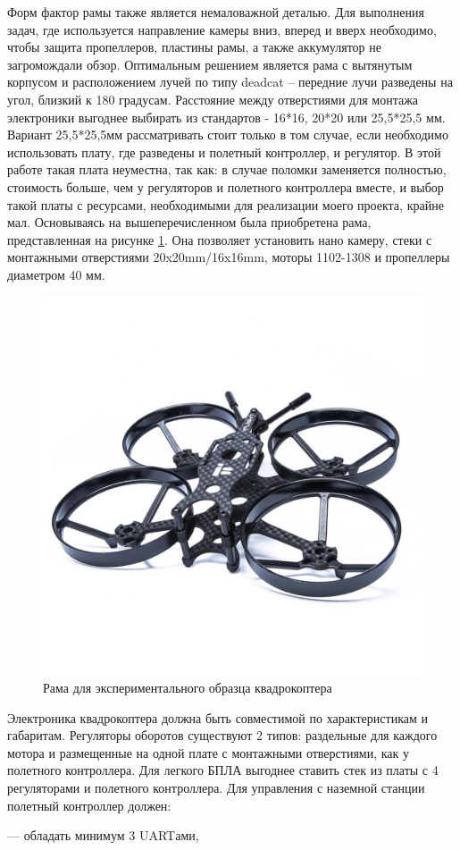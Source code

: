Форм фактор рамы также является немаловажной деталью. Для выполнения задач, где используется направление камеры вниз, вперед и вверх необходимо, чтобы защита пропеллеров, пластины рамы, а также аккумулятор не загромождали обзор. Оптимальным решением является рама с вытянутым корпусом и расположением лучей по типу deadcat -- передние лучи разведены на угол, близкий к 180 градусам. Расстояние между отверстиями для монтажа электроники выгоднее выбирать из стандартов - 16*16, 20*20 или 25,5*25,5 мм. Вариант 25,5*25,5мм рассматривать стоит только в том случае, если необходимо использовать плату, где разведены и полетный контроллер, и регулятор. В этой работе такая плата неуместна, так как: в случае поломки заменяется полностью, стоимость больше, чем у регуляторов и полетного контроллера вместе, и выбор такой платы с ресурсами, необходимыми для реализации моего проекта, крайне мал. Основываясь на вышеперечисленном была приобретена рама, представленная на рисунке \ref{fig:frame}. Она позволяет установить нано камеру, стеки с монтажными отверстиями 20x20mm/16x16mm, моторы 1102-1308 и пропеллеры диаметром 40 мм.


\begin{figure}[H]
	\centering
	\includegraphics[width=0.5\linewidth]{pics/frame}
	\caption{Рама для экспериментального образца квадрокоптера
	}
	\label{fig:frame} %
\end{figure}

Электроника квадрокоптера должна быть совместимой по характеристикам и габаритам. Регуляторы оборотов существуют 2 типов: раздельные для каждого мотора и размещенные на одной плате с монтажными отверстиями, как у полетного контроллера. Для легкого БПЛА выгоднее ставить стек из платы с 4 регуляторами и полетного контроллера.
Для управления с наземной станции полетный контроллер должен:

--- обладать минимум 3 UARTами,

